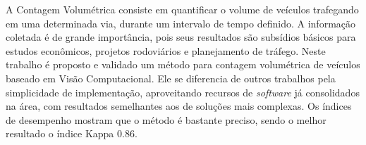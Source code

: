 
A Contagem Volumétrica consiste em quantificar o volume de veículos trafegando em uma determinada via, durante um intervalo de tempo definido. A informação coletada é de grande importância, pois seus resultados são subsídios básicos para estudos econômicos, projetos rodoviários e planejamento de tráfego. Neste trabalho é proposto e validado um método para contagem volumétrica de veículos baseado em Visão Computacional. Ele se diferencia de outros trabalhos pela simplicidade de implementação, aproveitando recursos de \textit{software} já consolidados na área, com resultados semelhantes aos de soluções mais complexas. Os índices de desempenho mostram que o método é bastante preciso, sendo o melhor resultado o índice Kappa $0.86$.

